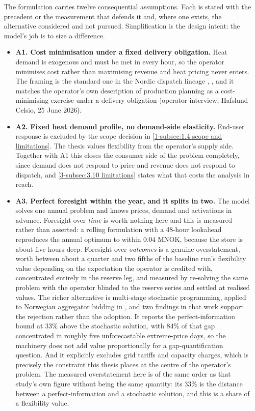 The formulation carries twelve consequential assumptions. Each is stated with the precedent or the measurement that defends it and, where one exists, the alternative considered and not pursued. Simplification is the design intent: the model's job is to size a difference.

\begin{itemize}
    \item \textbf{A1. Cost minimisation under a fixed delivery obligation.} Heat demand is exogenous and must be met in every hour, so the operator minimises cost rather than maximising revenue and heat pricing never enters. The framing is the standard one in the Nordic dispatch lineage \cite{kirkerud_impacts_2016}, \cite{tromborg_flexible_2017}, and it matches the operator's own description of production planning as a cost-minimising exercise under a delivery obligation (operator interview, Hafslund Celsio, 25 June 2026).

    \item \textbf{A2. Fixed heat demand profile, no demand-side elasticity.} End-user response is excluded by the scope decision in \autoref{1-subsec:1.4 scope and limitations}. The thesis values flexibility from the operator's supply side. Together with A1 this closes the consumer side of the problem completely, since demand does not respond to price and revenue does not respond to dispatch, and \autoref{3-subsec:3.10 limitations} states what that costs the analysis in reach.

    \item \textbf{A3. Perfect foresight within the year, and it splits in two.} The model solves one annual problem and knows prices, demand and activations in advance. Foresight over \emph{time} is worth nothing here and this is measured rather than asserted: a rolling formulation with a 48-hour lookahead reproduces the annual optimum to within 0.04 MNOK, because the store is about five hours deep. Foresight over \emph{outcomes} is a genuine overstatement, worth between about a quarter and two fifths of the baseline run's flexibility value depending on the expectation the operator is credited with, concentrated entirely in the reserve leg, and measured by re-solving the same problem with the operator blinded to the reserve series and settled at realised values. The richer alternative is multi-stage stochastic programming, applied to Norwegian aggregator bidding in \cite{ottesen_multi_2018}, and two findings in that work support the rejection rather than the adoption. It reports the perfect-information bound at $33\%$ above the stochastic solution, with $84\%$ of that gap concentrated in roughly five unforecastable extreme-price days, so the machinery does not add value proportionally for a gap-quantification question. And it explicitly excludes grid tariffs and capacity charges, which is precisely the constraint this thesis places at the centre of the operator's problem. The measured overstatement here is of the same order as that study's own figure without being the same quantity: its $33\%$ is the distance between a perfect-information and a stochastic solution, and this is a share of a flexibility value.


\end{itemize}
